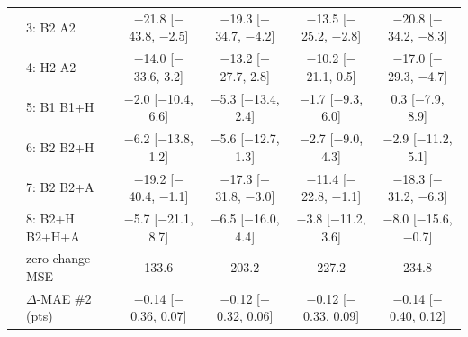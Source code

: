 \begin{table}[h]
{\begin{tabular}{llcccc}
 & 3: B2 \cto{} A2 & $-$21.8 [$-$43.8, $-$2.5] & $-$19.3 [$-$34.7, $-$4.2] & $-$13.5 [$-$25.2, $-$2.8] & $-$20.8 [$-$34.2, $-$8.3] \\
 & 4: H2 \cto{} A2 & $-$14.0 [$-$33.6, 3.2] & $-$13.2 [$-$27.7, 2.8] & $-$10.2 [$-$21.1, 0.5] & $-$17.0 [$-$29.3, $-$4.7] \\
 & 5: B1 \cto{} B1+H & $-$2.0 [$-$10.4, 6.6] & $-$5.3 [$-$13.4, 2.4] & $-$1.7 [$-$9.3, 6.0] & 0.3 [$-$7.9, 8.9] \\
 & 6: B2 \cto{} B2+H & $-$6.2 [$-$13.8, 1.2] & $-$5.6 [$-$12.7, 1.3] & $-$2.7 [$-$9.0, 4.3] & $-$2.9 [$-$11.2, 5.1] \\
 & 7: B2 \cto{} B2+A & $-$19.2 [$-$40.4, $-$1.1] & $-$17.3 [$-$31.8, $-$3.0] & $-$11.4 [$-$22.8, $-$1.1] & $-$18.3 [$-$31.2, $-$6.3] \\
 & 8: B2+H \cto{} B2+H+A & $-$5.7 [$-$21.1, 8.7] & $-$6.5 [$-$16.0, 4.4] & $-$3.8 [$-$11.2, 3.6] & $-$8.0 [$-$15.6, $-$0.7] \\
 & zero-change MSE & 133.6 & 203.2 & 227.2 & 234.8 \\
 & $\Delta$-MAE \#2 (pts) & $-$0.14 [$-$0.36, 0.07] & $-$0.12 [$-$0.32, 0.06] & $-$0.12 [$-$0.33, 0.09] & $-$0.14 [$-$0.40, 0.12] \\
\bottomrule
\end{tabular}
}
\end{table}

